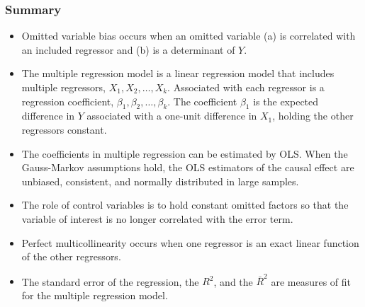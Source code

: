

\begin{frame}
\frametitle{Summary}
\begin{itemize}
\item Omitted variable bias occurs when an omitted variable (a) is correlated with an included regressor and (b) is a determinant of $Y$.
\item The multiple regression model is a linear regression model that includes multiple regressors, $X_1,X_2,\ldots,X_k$. Associated with each regressor is a regression coefficient, $\beta_1,\beta_2,\ldots,\beta_k$. The coefficient $\beta_1$ is the expected difference in $Y$ associated with a one-unit difference in $X_1$, holding the other regressors constant.
\item The coefficients in multiple regression can be estimated by OLS. When the Gauss-Markov assumptions hold, the OLS estimators of the causal effect are unbiased, consistent, and normally distributed in large samples.
\item The role of control variables is to hold constant omitted factors so that the variable of interest is no longer correlated with the error term.
\item Perfect multicollinearity occurs when one regressor is an exact linear function of the other regressors.
\item The standard error of the regression, the $R^2$, and the $\bar{R}^2$ are measures of fit for the multiple regression model.
\end{itemize}
\end{frame}


